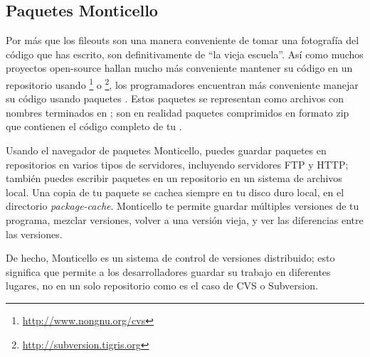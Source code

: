 \documentclass[a4paper,10pt,twoside]{book}
\begin{document}
\subsection{Paquetes Monticello}
Por m\'as que los fileouts son una manera conveniente de tomar una fotograf\'ia del c\'odigo que has escrito, son definitivamente de ``la vieja escuela''.
As\'i como muchos proyectos open-source hallan mucho m\'as conveniente mantener su c\'odigo en un repositorio usando \footnote{\url{http://www.nongnu.org/cvs}} o \footnote{\url{http://subversion.tigris.org}}, los programadores \pharo encuentran m\'as conveniente manejar su c\'odigo usando paquetes .
Estos paquetes se representan como archivos con nombres terminados en ; son en realidad paquetes comprimidos en formato zip que contienen el c\'odigo completo de tu .

Usando el navegador de paquetes Monticello, puedes guardar paquetes en repositorios en varios tipos de servidores, incluyendo servidores FTP y HTTP; tambi\'en puedes escribir paquetes en un repositorio en un sistema de archivos local. 
Una copia de tu paquete se cachea siempre en tu disco duro local, en el directorio \emph{package-cache}.
Monticello te permite guardar m\'ultiples versiones de tu programa, mezclar versiones, volver a una versi\'on vieja, y ver las diferencias entre las versiones.

De hecho, Monticello es un sistema de control de versiones distribuido; esto significa que permite a los desarrolladores guardar su trabajo en diferentes lugares, no en un solo repositorio como es el caso de CVS o Subversion. 
 
\end{document}
